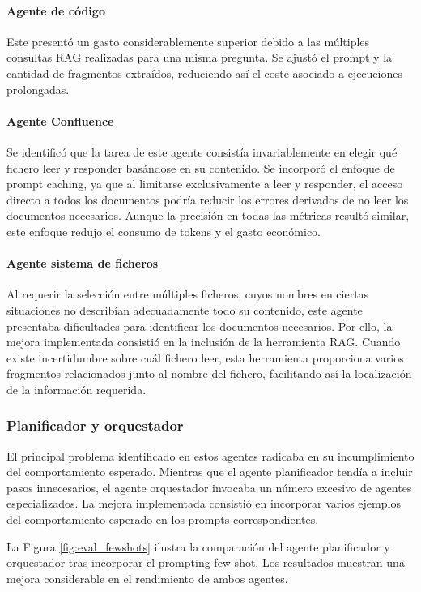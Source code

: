 \paragraph{Agente de código}Este presentó un gasto considerablemente superior debido a las múltiples consultas RAG realizadas para una misma pregunta. Se ajustó el prompt y la cantidad de fragmentos extraídos, reduciendo así el coste asociado a ejecuciones prolongadas.

\paragraph{Agente Confluence} Se identificó que la tarea de este agente consistía invariablemente en elegir qué fichero leer y responder basándose en su contenido. Se incorporó el enfoque de prompt caching, ya que al limitarse exclusivamente a leer y responder, el acceso directo a todos los documentos podría reducir los errores derivados de no leer los documentos necesarios. Aunque la precisión en todas las métricas resultó similar, este enfoque redujo el consumo de tokens y el gasto económico.

\paragraph{Agente sistema de ficheros}
Al requerir la selección entre múltiples ficheros, cuyos nombres en ciertas situaciones no describían adecuadamente todo su contenido, este agente presentaba dificultades para identificar los documentos necesarios. Por ello, la mejora implementada consistió en la inclusión de la herramienta RAG. Cuando existe incertidumbre sobre cuál fichero leer, esta herramienta proporciona varios fragmentos relacionados junto al nombre del fichero, facilitando así la localización de la información requerida.

\subsubsection{Planificador y orquestador}
El principal problema identificado en estos agentes radicaba en su incumplimiento del comportamiento esperado. Mientras que el agente planificador tendía a incluir pasos innecesarios, el agente orquestador invocaba un número excesivo de agentes especializados. La mejora implementada consistió en incorporar varios ejemplos del comportamiento esperado en los prompts correspondientes.

La Figura \ref{fig:eval_fewshots} ilustra la comparación del agente planificador y orquestador tras incorporar el prompting few-shot. Los resultados muestran una mejora considerable en el rendimiento de ambos agentes.


